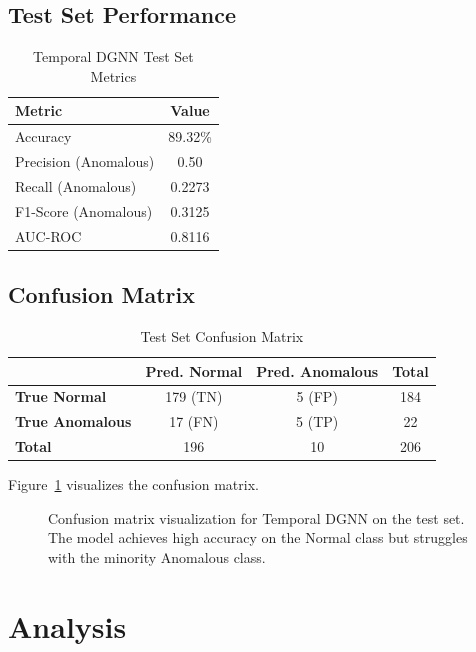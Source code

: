 \subsection{Test Set Performance}

\begin{table}[H]
\centering
\caption{Temporal DGNN Test Set Metrics}
\label{tab:test_metrics}
\begin{tabular}{lc}
\toprule
\textbf{Metric} & \textbf{Value} \\
\midrule
Accuracy & 89.32\% \\
Precision (Anomalous) & 0.50 \\
Recall (Anomalous) & 0.2273 \\
F1-Score (Anomalous) & 0.3125 \\
AUC-ROC & 0.8116 \\
\bottomrule
\end{tabular}
\end{table}


\subsection{Confusion Matrix}

\begin{table}[H]
\centering
\caption{Test Set Confusion Matrix}
\label{tab:confusion_matrix}
\begin{tabular}{l|cc|c}
\toprule
& \textbf{Pred. Normal} & \textbf{Pred. Anomalous} & \textbf{Total} \\
\midrule
\textbf{True Normal} & 179 (TN) & 5 (FP) & 184 \\
\textbf{True Anomalous} & 17 (FN) & 5 (TP) & 22 \\
\midrule
\textbf{Total} & 196 & 10 & 206 \\
\bottomrule
\end{tabular}
\end{table}

Figure~\ref{fig:confusion_matrices} visualizes the confusion matrix.

\begin{figure}[H]
    \centering
    
    \caption{Confusion matrix visualization for Temporal DGNN on the test set. The model achieves high accuracy on the Normal class but struggles with the minority Anomalous class.}
    \label{fig:confusion_matrices}
\end{figure}


\section{Analysis}

